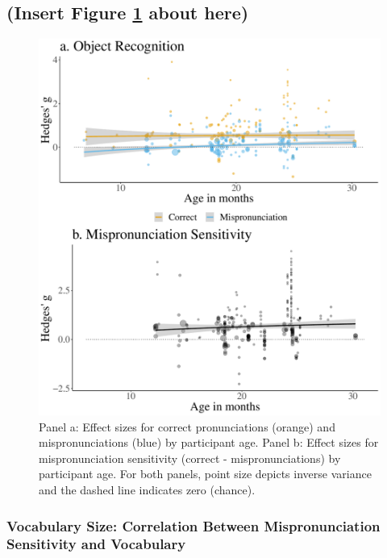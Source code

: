 \documentclass[man]{apa6}
\begin{document}
\hypertarget{insert-figure-reffigplotmpeffect-about-here}{%
\subsection{(Insert Figure \ref{fig:PlotMPEffect} about here)}\label{insert-figure-reffigplotmpeffect-about-here}}

\begin{figure}
\centering
\includegraphics{VonHolzenBergmann_MPMetaAnalysis_files/figure-latex/PlotMPEffect-1.pdf}
\caption{\label{fig:PlotMPEffect}Panel a: Effect sizes for correct pronunciations (orange) and mispronunciations (blue) by participant age. Panel b: Effect sizes for mispronunciation sensitivity (correct - mispronunciations) by participant age. For both panels, point size depicts inverse variance and the dashed line indicates zero (chance).}
\end{figure}

\hypertarget{vocabulary-size-correlation-between-mispronunciation-sensitivity-and-vocabulary}{%
\subsubsection{Vocabulary Size: Correlation Between Mispronunciation Sensitivity and Vocabulary}\label{vocabulary-size-correlation-between-mispronunciation-sensitivity-and-vocabulary}}
\end{document}
